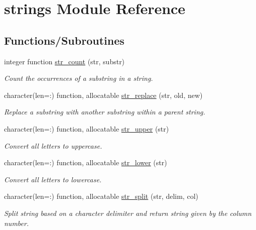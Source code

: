 \hypertarget{namespacestrings}{}\section{strings Module Reference}
\label{namespacestrings}
\subsection*{Functions/\+Subroutines}
\begin{DoxyCompactItemize}
\item 
integer function \mbox{\hyperlink{namespacestrings_a1b755da0409a70ccc4c25c1de4e7e009}{str\+\_\+count}} (str, substr)
\begin{DoxyCompactList}\small\item\em Count the occurrences of a substring in a string. \end{DoxyCompactList}\item 
character(len=\+:) function, allocatable \mbox{\hyperlink{namespacestrings_a2d557ee85358067ac58c78aeda61fefc}{str\+\_\+replace}} (str, old, new)
\begin{DoxyCompactList}\small\item\em Replace a substring with another substring within a parent string. \end{DoxyCompactList}\item 
character(len=\+:) function, allocatable \mbox{\hyperlink{namespacestrings_afd1c79d1ba7dfe3ca9c77cab4f936c99}{str\+\_\+upper}} (str)
\begin{DoxyCompactList}\small\item\em Convert all letters to uppercase. \end{DoxyCompactList}\item 
character(len=\+:) function, allocatable \mbox{\hyperlink{namespacestrings_a9c44648f65a85e1e78b5e1c75ea67619}{str\+\_\+lower}} (str)
\begin{DoxyCompactList}\small\item\em Convert all letters to lowercase. \end{DoxyCompactList}\item 
character(len=\+:) function, allocatable \mbox{\hyperlink{namespacestrings_ae0ef0af953180efc5cbda255e58e521c}{str\+\_\+split}} (str, delim, col)
\begin{DoxyCompactList}\small\item\em Split string based on a character delimiter and return string given by the column number. \end{DoxyCompactList}\item 

\end{DoxyCompactItemize}

